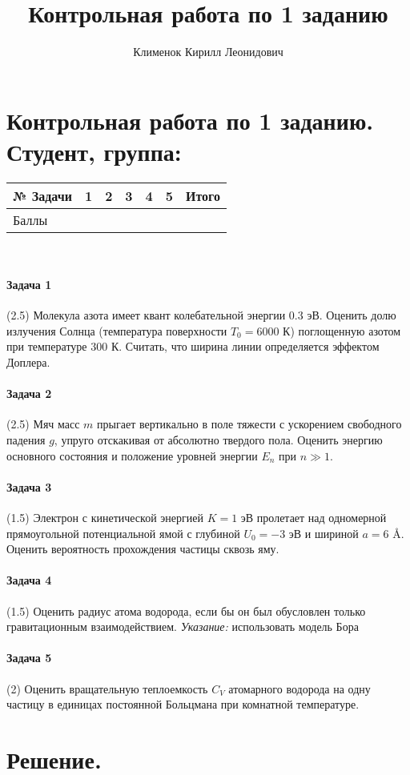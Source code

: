 \documentclass[11pt,a4paper]{article}
\author{Клименок Кирилл Леонидович}
\title{Контрольная работа по 1 заданию}
\begin{document}
	\pagestyle{empty}
	\section*{Контрольная работа по 1 заданию.\\[10pt] Студент, группа:}
	\begin{tabular}{|p{2cm}|p{1cm}|p{1cm}|p{1cm}|p{1cm}|p{1cm}|p{1cm}|}
		\hline \rule[-2ex]{0pt}{5.5ex} № Задачи & 1 & 2 & 3 & 4 & 5 & Итого \\ 
		\hline \rule[-2ex]{0pt}{5.5ex} Баллы &  &  &  &  &  &  \\ 
		\hline 
	\end{tabular} 
	\\
	
	\paragraph{Задача 1}(2.5) Молекула азота имеет квант колебательной энергии 0.3 эВ. Оценить долю излучения Солнца (температура поверхности $T_0 = 6000$ К) поглощенную азотом при температуре $300$ К. Считать, что ширина линии определяется эффектом Доплера.
	\paragraph{Задача 2}(2.5) Мяч масс $m$ прыгает вертикально в поле тяжести с ускорением свободного падения $g$, упруго отскакивая от абсолютно твердого пола. Оценить энергию основного состояния и положение уровней энергии $E_n$ при $n \gg 1$.
	\paragraph{Задача 3}(1.5) Электрон с кинетической энергией $K=1$ эВ пролетает над одномерной прямоугольной потенциальной ямой с глубиной $U_0 = -3$ эВ и шириной $a = 6$ \AA. Оценить вероятность прохождения частицы сквозь яму.
	\paragraph{Задача 4}(1.5) Оценить радиус атома водорода, если бы он был обусловлен только гравитационным взаимодействием. \textit{Указание:} использовать модель Бора
	\paragraph{Задача 5}(2) Оценить вращательную теплоемкость $C_V$ атомарного водорода на одну частицу в единицах постоянной Больцмана при комнатной температуре.
	
	\section*{Решение.}
	
\end{document}
